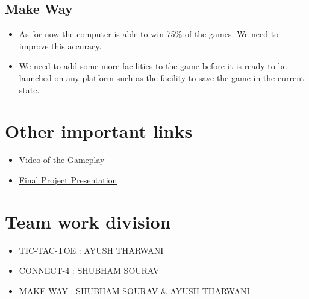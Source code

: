 \documentclass[11pt]{article}
\begin{document}
\subsection{Make Way}
\begin{itemize}
\item As for now the computer is able to win 75\% of the games. We need to improve this accuracy.
\item We need to add some more facilities to the game before it is ready to be launched on any platform such as the facility to save the game in the current state.
\end{itemize}

\pagebreak

\section{Other important links}

\begin{itemize}
\item \href{https://youtu.be/HEFEKcliYQg}{\color{blue}Video of the Gameplay}

\item \href{https://l.facebook.com/l.php?u=https%3A%2F%2Fprezi.com%2Fview%2FVdBwDF3cqp5JxeV8AsYG%2F&h=AT2LT4jbcBoNtc2_0yGSPBjFaLHY-cRJchBzONhzTmqTn-YB9kbss4PU36ULNAzbEFEY5xrZGC0jPShxeyFY79ol4vYZ-6taYsJqXMaHpals4RjY_T2K-e0N7Jtz7DduiDkzmw}{\color{blue}Final Project Presentation }\linebreak \linebreak
\end{itemize}

\section{Team work division}
\begin{itemize}
    \item TIC-TAC-TOE   :    AYUSH THARWANI
    \item CONNECT-4      \quad :    SHUBHAM SOURAV
    \item MAKE WAY    \quad   :    SHUBHAM SOURAV \& AYUSH THARWANI
\end{itemize}
\end{document}
